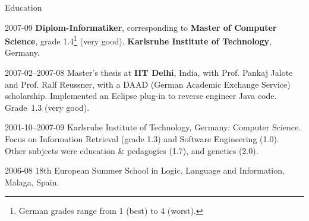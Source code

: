 \begin{cv}{}
  \begin{cvlist}{Education}
  \item[2007-09] \textbf{Diplom-Informatiker},
    corresponding to \textbf{Master of Computer Science}, grade
    1.4\footnote{German grades range from 1 (best) to 4 (worst).}
    (very good). \textbf{Karlsruhe Institute of Technology}, Germany.
  \item[2007-02--2007-08] Master's thesis at \textbf{IIT Delhi},
    India, with Prof. Pankaj Jalote and Prof. Ralf Reussner, with a
    DAAD (German Academic Exchange Service) scholarship.
    Implemented an Eclipse plug-in to reverse engineer
    Java code.  Grade~1.3 (very good)\footnotemark[\value{footnote}].
  \item[2001-10--2007-09] Karlsruhe Institute of Technology, Germany: Computer
    Science.  \\Focus on Information Retrieval (grade
    1.3\footnotemark[\value{footnote}]) and Software Engineering
    (1.0).  \\Other subjects were education \& pedagogics (1.7), and
    genetics (2.0).
  \item[2006-08] 18th European Summer School in Logic, Language and
    Information, Malaga, Spain.
  \end{cvlist}


\end{cv}
